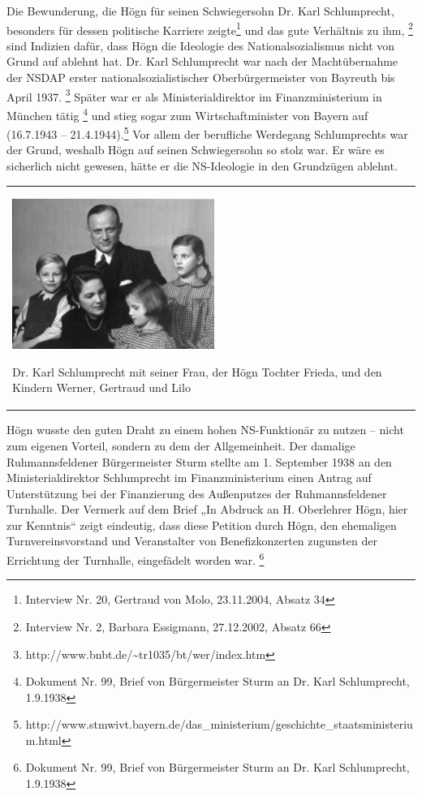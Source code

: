 Die Bewunderung, die Högn für seinen Schwiegersohn Dr. Karl
Schlumprecht, besonders für dessen politische Karriere zeigte\footnote{
Interview Nr. 20, Gertraud von Molo, 23.11.2004, Absatz 34} und das
gute Verhältnis zu ihm, \footnote{Interview Nr. 2, Barbara Essigmann,
27.12.2002, Absatz 66} sind Indizien dafür, dass Högn die Ideologie des
Nationalsozialismus nicht von Grund auf ablehnt hat. Dr. Karl
Schlumprecht war nach der Machtübernahme der NSDAP erster
nationalsozialistischer Oberbürgermeister von Bayreuth bis April
1937. \footnote{http://www.bnbt.de/\~{}tr1035/bt/wer/index.htm} Später
war er als Ministerialdirektor im Finanzministerium in München
tätig \footnote{Dokument Nr. 99, Brief von Bürgermeister Sturm an Dr.
Karl Schlumprecht, 1.9.1938} und stieg sogar zum Wirtschaftminister von
Bayern auf (16.7.1943 – 21.4.1944).\footnote{
http://www.stmwivt.bayern.de/das\_ministerium/geschichte\_staatsministerium.html}
Vor allem der berufliche Werdegang Schlumprechts war der Grund, weshalb
Högn auf seinen Schwiegersohn so stolz war. Er wäre es sicherlich nicht
gewesen, hätte er die NS-Ideologie in den Grundzügen ablehnt.

\begin{center}
\begin{minipage}{6.969cm}
\begin{flushleft}
\tablefirsthead{}
\tablehead{}
\tabletail{}
\tablelasttail{}
\begin{supertabular}{m{6.769cm}}

\includegraphics[width=6.588cm,height=4.888cm]{pictures/zulassungsarbeit-img034.jpg}

Dr. Karl Schlumprecht mit seiner Frau,
der Högn Tochter Frieda, und den Kindern Werner, Gertraud und Lilo\\
\end{supertabular}
\end{flushleft}
\end{minipage}
\end{center}
Högn wusste den guten Draht zu einem hohen NS-Funktionär zu nutzen –
nicht zum eigenen Vorteil, sondern zu dem der Allgemeinheit. Der
damalige Ruhmannsfeldener Bürgermeister Sturm stellte am 1. September
1938 an den Ministerialdirektor Schlumprecht im Finanzministerium einen
Antrag auf Unterstützung bei der Finanzierung des Außenputzes der
Ruhmannsfeldener Turnhalle. Der Vermerk auf dem Brief „In Abdruck an H.
Oberlehrer Högn, hier zur Kenntnis“ zeigt eindeutig, dass diese
Petition durch Högn, den ehemaligen Turnvereinsvorstand und
Veranstalter von Benefizkonzerten zugunsten der Errichtung der
Turnhalle, eingefädelt worden war. \footnote{Dokument Nr. 99, Brief von
Bürgermeister Sturm an Dr. Karl Schlumprecht, 1.9.1938}


